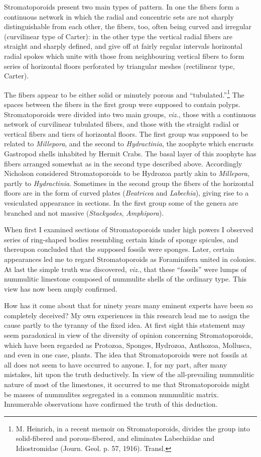 \documentclass[a4paper, 12pt, oneside]{article}
\begin{document}
Stromatoporoids present two main types of pattern. In one the fibers form a continuous network in which the radial and concentric sets are not sharply distinguishable from each other, the fibers, too, often being curved and irregular (curvilinear type of Carter): in the other type the vertical radial fibers are straight and sharply defined, and give off at fairly regular intervals horizontal radial spokes which unite with those from neighbouring vertical fibers to form series of horizontal floors perforated by triangular meshes (rectilinear type, Carter).

The fibers appear to be either solid or minutely porous and ``tubulated.''\footnote{M. Heinrich, in a recent memoir on Stromatoporoids, divides the group into solid-fibered and porous-fibered, and eliminates Labechiidae and Idiostromidae (Journ. Geol. p. 57, 1916). Transl.} The spaces between the fibers in the first group were supposed to contain polyps. Stromatoporoids were divided into two main groups, \emph{viz.}, those with a continuous network of curvilinear tubulated fibers, and those with the straight radial or vertical fibers and tiers of horizontal floors. The first group was supposed to be related to \emph{Millepora}, and the second to \emph{Hydractinia}, the zoophyte which encrusts Gastropod shells inhabited by Hermit Crabs. The basal layer of this zoophyte has fibers arranged somewhat as in the second type described above. Accordingly Nicholson considered Stromatoporoids to be Hydrozoa partly akin to \emph{Millepora}, partly to \emph{Hydractinia}. Sometimes in the second group the fibers of the horizontal floors are in the form of curved plates (\emph{Beatricea} and \emph{Labechia}), giving rise to a vesiculated appearance in sections. In the first group some of the genera are branched and not massive (\emph{Stackyodes}, \emph{Amphipora}).

When first I examined sections of Stromatoporoids under high powers I observed series of ring-shaped bodies resembling certain kinds of sponge spicules, and thereupon concluded that the supposed fossils were sponges. Later, certain appearances led me to regard Stromatoporoids as Foraminifera united in colonies. At last the simple truth was discovered, \emph{viz.}, that these ``fossils'' were lumps of nummulitic limestone composed of nummulite shells of the ordinary type. This view has now been amply confirmed.

How has it come about that for ninety years many eminent experts have been so completely deceived? My own experiences in this research lead me to assign the cause partly to the tyranny of the fixed idea. At first sight this statement may seem paradoxical in view of the diversity of opinion concerning Stromatoporoids, which have been regarded as Protozoa, Sponges, Hydrozoa, Anthozoa, Mollusca, and even in one case, plants. The idea that Stromatoporoids were not fossils at all does not seem to have occurred to anyone. I, for my part, after many mistakes, hit upon the truth deductively. In view of the all-prevailing nummulitic nature of most of the limestones, it occurred to me that Stromatoporoids might be masses of nummulites segregated in a common nummulitic matrix. Innumerable observations have confirmed the truth of this deduction.
\end{document}
